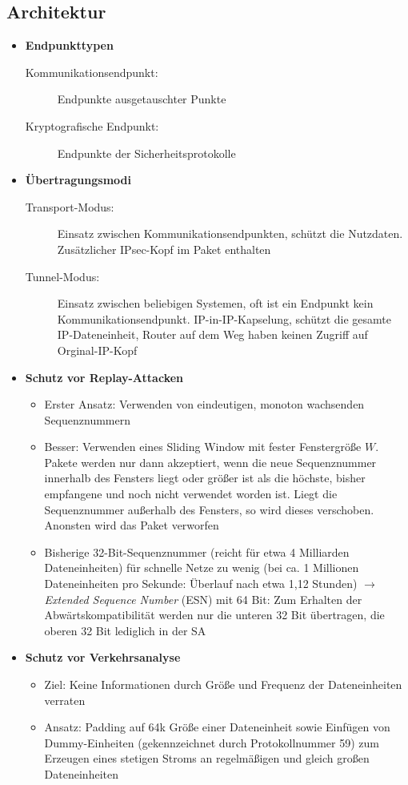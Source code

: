 \subsection{Architektur}
\begin{itemize}
	\item \textbf{Endpunkttypen}
	\begin{description}
		\item[Kommunikationsendpunkt:]Endpunkte ausgetauschter Punkte
		\item[Kryptografische Endpunkt:] Endpunkte der Sicherheitsprotokolle
	\end{description}
	\item \textbf{Übertragungsmodi}
	\begin{description}
		\item[Transport-Modus:] Einsatz zwischen Kommunikationsendpunkten, schützt die Nutzdaten. Zusätzlicher IPsec-Kopf im Paket enthalten
		\item[Tunnel-Modus:] Einsatz zwischen beliebigen Systemen, oft ist ein Endpunkt kein Kommunikationsendpunkt. IP-in-IP-Kapselung, schützt die gesamte IP-Dateneinheit, Router auf dem Weg haben keinen Zugriff auf Orginal-IP-Kopf
	\end{description}
	\item \textbf{Schutz vor Replay-Attacken}
	\begin{itemize}
		\item Erster Ansatz: Verwenden von eindeutigen, monoton wachsenden Sequenznummern
		\item Besser: Verwenden eines Sliding Window mit fester Fenstergröße \(W\). Pakete werden nur dann akzeptiert, wenn die neue Sequenznummer innerhalb des Fensters liegt oder größer ist als die höchste, bisher empfangene und noch nicht verwendet worden ist. Liegt die Sequenznummer außerhalb des Fensters, so wird dieses verschoben. Anonsten wird das Paket verworfen
		\item Bisherige 32-Bit-Sequenznummer (reicht für etwa 4 Milliarden Dateneinheiten) für schnelle Netze zu wenig (bei ca. 1 Millionen Dateneinheiten pro Sekunde: Überlauf nach etwa 1,12 Stunden) \(\rightarrow\) \textit{Extended Sequence Number} (ESN) mit 64 Bit: Zum Erhalten der Abwärtskompatibilität werden nur die unteren 32 Bit übertragen, die oberen 32 Bit lediglich in der SA 
	\end{itemize}
	\item \textbf{Schutz vor Verkehrsanalyse}
	\begin{itemize}
		\item Ziel: Keine Informationen durch Größe und Frequenz der Dateneinheiten verraten
		\item Ansatz: Padding auf 64k Größe einer Dateneinheit sowie Einfügen von Dummy-Einheiten (gekennzeichnet durch Protokollnummer 59) zum Erzeugen eines stetigen Stroms an regelmäßigen und gleich großen Dateneinheiten
	\end{itemize}
\end{itemize}


